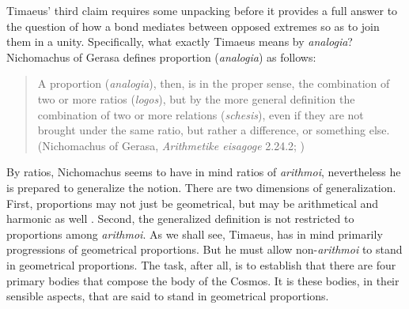 Timaeus' third claim requires some unpacking before it provides a full answer to the question of how a bond mediates between opposed extremes so as to join them in a unity. Specifically, what exactly Timaeus means by \emph{analogia}? Nichomachus of Gerasa defines proportion (\emph{analogia}) as follows:
\begin{quote}
	A proportion (\emph{analogia}), then, is in the proper sense, the combination of two or more ratios (\emph{logos}), but by the more general definition the combination of two or more relations (\emph{schesis}), even if they are not brought under the same ratio, but rather a difference, or something else. (Nichomachus of Gerasa, \emph{Arithmetike eisagoge} 2.24.2; \citealt[264--5]{Dooge:1926aa})
\end{quote}
By ratios, Nichomachus seems to have in mind ratios of \emph{arithmoi}, nevertheless he is prepared to generalize the notion. There are two dimensions of generalization. First, proportions may not just be geometrical, but may be arithmetical and harmonic as well \citep[264 n2]{Dooge:1926aa}. Second, the generalized definition is not restricted to proportions among \emph{arithmoi}. As we shall see, Timaeus, has in mind primarily progressions of geometrical proportions. But he must allow non-\emph{arithmoi} to stand in geometrical proportions. The task, after all, is to establish that there are four primary bodies that compose the body of the Cosmos. It is these bodies, in their sensible aspects, that are said to stand in geometrical proportions.

